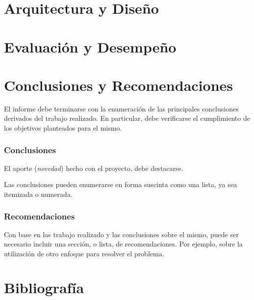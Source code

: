 \chapter{Arquitectura y Diseño}




\chapter{Evaluación y Desempeño}



\chapter{Conclusiones y Recomendaciones}
El informe debe terminarse con la enumeración de las principales conclusiones derivados del trabajo realizado.  En particular, debe verificarse el cumplimiento de los objetivos planteados para el mismo.

\subsection{Conclusiones}
El aporte (\emph{novedad}) hecho con el proyecto, debe destacarse.

Las conclusiones pueden enumerarse en forma suscinta como una lista, ya sea itemizada o numerada.

\subsection{Recomendaciones}
Con base en las trabajo realizado y las conclusiones sobre el mismo, puede ser necesario incluir una sección, o lista, de recomendaciones.  Por ejemplo, sobre la utilización de otro enfoque para resolver el problema.


\chapter{Bibliografía}